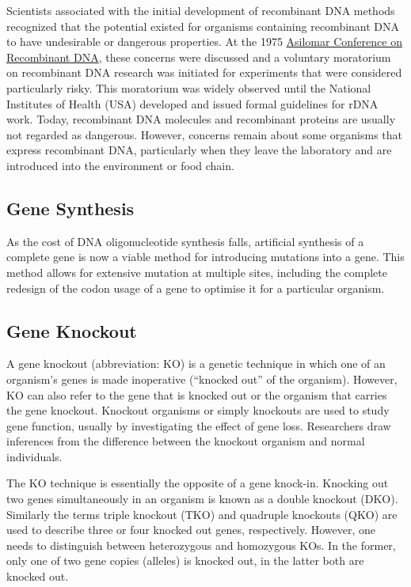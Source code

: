 Scientists associated with the initial development of recombinant DNA methods recognized that the potential existed for organisms containing recombinant DNA to have undesirable or dangerous properties. At the 1975 \href{https://en.wikipedia.org/wiki/Asilomar_Conference_on_Recombinant_DNA}{Asilomar Conference on Recombinant DNA}, these concerns were discussed and a voluntary moratorium on recombinant DNA research was initiated for experiments that were considered particularly risky. This moratorium was widely observed until the National Institutes of Health (USA) developed and issued formal guidelines for rDNA work. Today, recombinant DNA molecules and recombinant proteins are usually not regarded as dangerous. However, concerns remain about some organisms that express recombinant DNA, particularly when they leave the laboratory and are introduced into the environment or food chain.

\hypertarget{gene-synthesis}{%
\subsection{Gene Synthesis}\label{gene-synthesis}}

As the cost of DNA oligonucleotide synthesis falls, artificial synthesis of a complete gene is now a viable method for introducing mutations into a gene. This method allows for extensive mutation at multiple sites, including the complete redesign of the codon usage of a gene to optimise it for a particular organism.

\hypertarget{gene-knockout}{%
\subsection{Gene Knockout}\label{gene-knockout}}

A gene knockout (abbreviation: KO) is a genetic technique in which one of an organism's genes is made inoperative (``knocked out'' of the organism). However, KO can also refer to the gene that is knocked out or the organism that carries the gene knockout. Knockout organisms or simply knockouts are used to study gene function, usually by investigating the effect of gene loss. Researchers draw inferences from the difference between the knockout organism and normal individuals.

The KO technique is essentially the opposite of a gene knock-in. Knocking out two genes simultaneously in an organism is known as a double knockout (DKO). Similarly the terms triple knockout (TKO) and quadruple knockouts (QKO) are used to describe three or four knocked out genes, respectively. However, one needs to distinguish between heterozygous and homozygous KOs. In the former, only one of two gene copies (alleles) is knocked out, in the latter both are knocked out.

